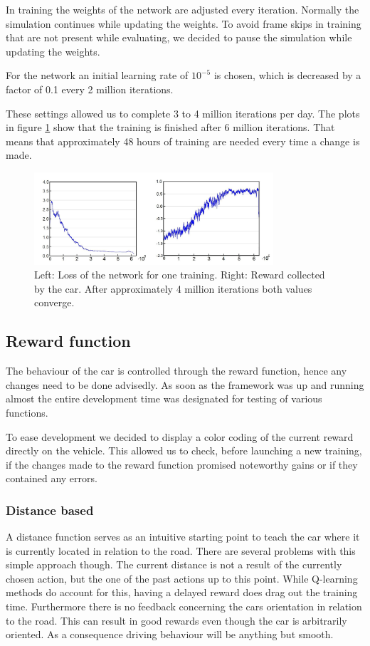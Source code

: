 In training the weights of the network are adjusted every iteration. Normally the simulation continues while updating the weights. To avoid frame skips in training that are not present while evaluating, we decided to pause the simulation while updating the weights.

For the network an initial learning rate of $10^{-5}$ is chosen, which is decreased by a factor of 0.1 every 2 million iterations.

These settings allowed us to complete 3 to 4 million iterations per day. The plots in figure \ref{fig:lossandrew} show that the training is finished after 6 million iterations. That means that approximately 48 hours of training are needed every time a change is made.

\begin{figure}[!t]
\centering
\includegraphics[width=3.5in]{../presentation/both-plot.jpg} 
\caption{Left: Loss of the network for one training. Right: Reward collected by the car. After approximately 4 million iterations both values converge.}
\label{fig:lossandrew}
\end{figure}
 

\subsection{Reward function}
The behaviour of the car is controlled through the reward function, hence any changes need to be done advisedly. As soon as the framework was up and running almost the entire development time was designated for testing of various functions. 

To ease development we decided to display a color coding of the current reward directly on the vehicle. This allowed us to check, before launching a new training, if the changes made to the reward function promised noteworthy gains or if they contained any errors. 
\subsubsection{Distance based}
A distance function serves as an intuitive starting point to teach the car where it is currently located in relation to the road. There are several problems with this simple approach though. The current distance is not a result of the currently chosen action, but the one of the past actions up to this point. While Q-learning methods do account for this, having a delayed reward does drag out the training time. Furthermore there is no feedback concerning the cars orientation in relation to the road. This can result in good rewards even though the car is arbitrarily oriented. As a consequence driving behaviour will be anything but smooth.
